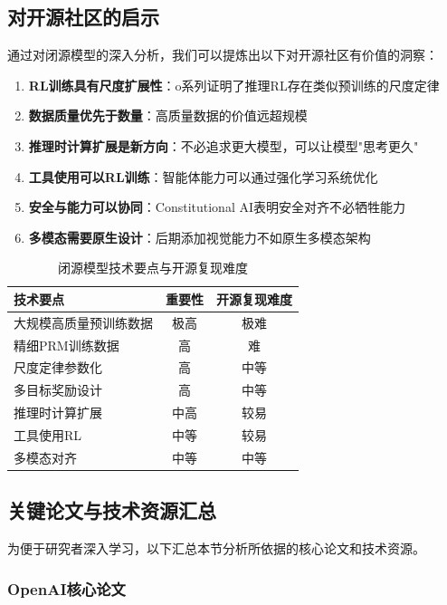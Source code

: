 \documentclass[12pt,a4paper]{article}
\begin{document}
\subsection{对开源社区的启示}

通过对闭源模型的深入分析，我们可以提炼出以下对开源社区有价值的洞察：

\begin{enumerate}
    \item \textbf{RL训练具有尺度扩展性}：o系列证明了推理RL存在类似预训练的尺度定律
    \item \textbf{数据质量优先于数量}：高质量数据的价值远超规模
    \item \textbf{推理时计算扩展是新方向}：不必追求更大模型，可以让模型"思考更久"
    \item \textbf{工具使用可以RL训练}：智能体能力可以通过强化学习系统优化
    \item \textbf{安全与能力可以协同}：Constitutional AI表明安全对齐不必牺牲能力
    \item \textbf{多模态需要原生设计}：后期添加视觉能力不如原生多模态架构
\end{enumerate}

\begin{table}[H]
\centering
\caption{闭源模型技术要点与开源复现难度}
\begin{tabular}{lcc}
\toprule
\textbf{技术要点} & \textbf{重要性} & \textbf{开源复现难度} \\
\midrule
大规模高质量预训练数据 & 极高 & 极难 \\
精细PRM训练数据 & 高 & 难 \\
尺度定律参数化 & 高 & 中等 \\
多目标奖励设计 & 高 & 中等 \\
推理时计算扩展 & 中高 & 较易 \\
工具使用RL & 中等 & 较易 \\
多模态对齐 & 中等 & 中等 \\
\bottomrule
\end{tabular}
\end{table}

\subsection{关键论文与技术资源汇总}

为便于研究者深入学习，以下汇总本节分析所依据的核心论文和技术资源。

\subsubsection{OpenAI核心论文}
\end{document}
